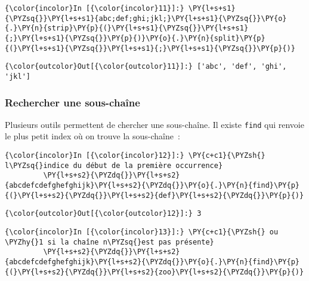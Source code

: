     \begin{Verbatim}[commandchars=\\\{\}]
{\color{incolor}In [{\color{incolor}11}]:} \PY{l+s+s1}{\PYZsq{}}\PY{l+s+s1}{abc;def;ghi;jkl;}\PY{l+s+s1}{\PYZsq{}}\PY{o}{.}\PY{n}{strip}\PY{p}{(}\PY{l+s+s1}{\PYZsq{}}\PY{l+s+s1}{;}\PY{l+s+s1}{\PYZsq{}}\PY{p}{)}\PY{o}{.}\PY{n}{split}\PY{p}{(}\PY{l+s+s1}{\PYZsq{}}\PY{l+s+s1}{;}\PY{l+s+s1}{\PYZsq{}}\PY{p}{)}
\end{Verbatim}


\begin{Verbatim}[commandchars=\\\{\}]
{\color{outcolor}Out[{\color{outcolor}11}]:} ['abc', 'def', 'ghi', 'jkl']
\end{Verbatim}
            
    \hypertarget{rechercher-une-sous-chauxeene}{%
\subsubsection{Rechercher une
sous-chaîne}\label{rechercher-une-sous-chauxeene}}

    Plusieurs outils permettent de chercher une sous-chaîne. Il existe
\texttt{find} qui renvoie le plus petit index où on trouve la
sous-chaîne~:

    \begin{Verbatim}[commandchars=\\\{\}]
{\color{incolor}In [{\color{incolor}12}]:} \PY{c+c1}{\PYZsh{} l\PYZsq{}indice du début de la première occurrence}
         \PY{l+s+s2}{\PYZdq{}}\PY{l+s+s2}{abcdefcdefghefghijk}\PY{l+s+s2}{\PYZdq{}}\PY{o}{.}\PY{n}{find}\PY{p}{(}\PY{l+s+s2}{\PYZdq{}}\PY{l+s+s2}{def}\PY{l+s+s2}{\PYZdq{}}\PY{p}{)}
\end{Verbatim}


\begin{Verbatim}[commandchars=\\\{\}]
{\color{outcolor}Out[{\color{outcolor}12}]:} 3
\end{Verbatim}
            
    \begin{Verbatim}[commandchars=\\\{\}]
{\color{incolor}In [{\color{incolor}13}]:} \PY{c+c1}{\PYZsh{} ou \PYZhy{}1 si la chaîne n\PYZsq{}est pas présente}
         \PY{l+s+s2}{\PYZdq{}}\PY{l+s+s2}{abcdefcdefghefghijk}\PY{l+s+s2}{\PYZdq{}}\PY{o}{.}\PY{n}{find}\PY{p}{(}\PY{l+s+s2}{\PYZdq{}}\PY{l+s+s2}{zoo}\PY{l+s+s2}{\PYZdq{}}\PY{p}{)}
\end{Verbatim}


